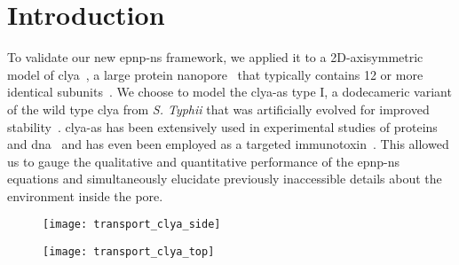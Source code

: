 %
%
%
%


\section{Introduction}
%
\label{sec:transport:intro}
%




To validate our new \gls{epnp-ns} framework, we applied it to a 2D-axisymmetric model of
\gls{clya}~\cite{Mueller-2009}, a large protein nanopore~\cite{Soskine-2012} that typically contains 12 or
more identical subunits~\cite{Soskine-2013,Peng-2019}. We choose to model the \gls{clya-as} type I, a
dodecameric variant of the wild type \gls{clya} from \textit{S. Typhii} that was artificially evolved for
improved stability~\cite{Soskine-2013}. \Gls{clya-as} has been extensively used in experimental studies of
proteins~\cite{Soskine-2013,VanMeervelt-2014,Soskine-Biesemans-2015,Biesemans-2015,Wloka-2017,
VanMeervelt-2017,Galenkamp-2018,Willems-Ruic-Biesemans-2019,Zernia-2020,Galenkamp-2020} and
\gls{dna}~\cite{Franceschini-2013,Franceschini-2016,Nomidis-2018} and has even been employed as a targeted
immunotoxin~\cite{Mutter-2018}. This allowed us to gauge the qualitative and quantitative performance of the
\gls{epnp-ns} equations and simultaneously elucidate previously inaccessible details about the environment
inside the pore.


%
\begin{figure*}[b]
  \centering
  \begin{subfigure}[t]{5.5cm}
    \centering
    \caption{}\hspace{0mm}\label{fig:transport_clya_side}
    \texttt{[image: transport\_clya\_side]}
  \end{subfigure}
  \begin{subfigure}[t]{5.5cm}
    \centering
    \caption{}\hspace{0mm}\label{fig:transport_clya_top}
    \texttt{[image: transport\_clya\_top]}
  \end{subfigure}

  \caption[All-atom model of {ClyA-AS}]
  {%
    \textbf{All-atom models of {ClyA-AS}.}
    ()
    Axial cross-sectional and
    ()
    top views of the dodecameric nanopore \gls{clya-as}~\cite{Soskine-2013}, derived through homology
    modeling from the \textit{E. coli} \gls{clya} crystal structure (~\cite{Mueller-2009}).
    Measurements indicate the average `cylindrical' sizes of the \cisi{} \lumen{} (\SI{6}{\nm} in diameter,
    \SI{10}{\nm} in height) and the \transi{} constriction (\SI{3.3}{\nm} in diameter, \SI{4}{\nm} in height).
    Images were rendered with ~\cite{Humphrey-1996,Stone-1998}.
  }\label{fig:transport_clya}
\end{figure*}
%


